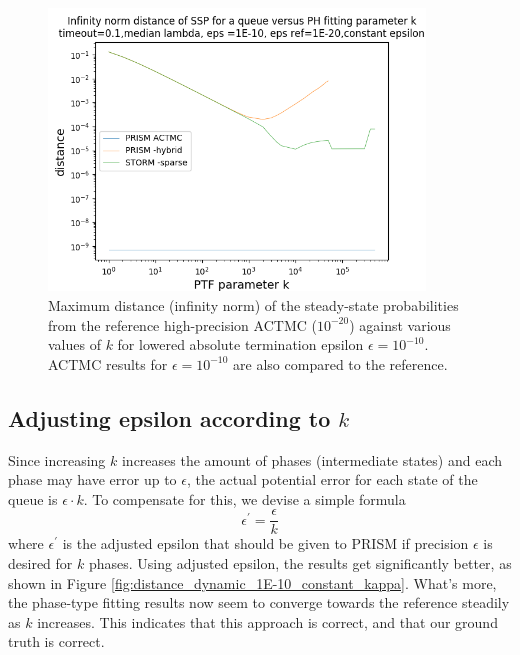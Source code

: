 \documentclass[runningheads,custombib]{llncs}
\begin{document}
	\begin{figure}[H]
		\begin{center}
			\includegraphics[trim=0.2cm 0cm 0cm 1.35cm,width=10cm, clip]{../picture/New_model/1E-10/distance_constant_1E-10.png}
		\end{center}
		\caption{Maximum distance (infinity norm) of the steady-state probabilities from the reference high-precision ACTMC ($10^{-20}$) against various values of $k$ for lowered absolute termination epsilon $\epsilon = 10^{-10}$. ACTMC results for $\epsilon = 10^{-10}$ are also compared to the reference.}
		\label{fig:distance_constant_1E-10_constant_kappa}
	\end{figure}
	
	\subsection{Adjusting epsilon according to $k$}
	\label{adjusting}
	
	Since increasing $k$ increases the amount of phases (intermediate states) and each phase may have error up to $\epsilon$, the actual potential error for each state of the queue is $\epsilon \cdot k$. To compensate for this, we devise a simple formula
	$$\epsilon^{'} = \frac{\epsilon}{k}$$
	where $\epsilon^{'}$ is the adjusted epsilon that should be given to PRISM if precision $\epsilon$ is desired for $k$ phases.
	Using adjusted epsilon, the results get significantly better, as shown in Figure \ref{fig:distance_dynamic_1E-10_constant_kappa}. What's more, the phase-type fitting results now seem to converge towards the reference steadily as $k$ increases. This indicates that this approach is correct, and that our ground truth is correct.
	
\end{document}
